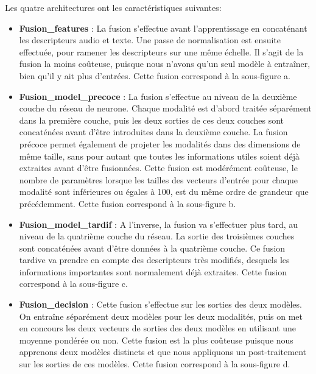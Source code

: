 

Les quatre architectures ont les caractéristiques suivantes:
\begin{itemize}
  \item \textbf{Fusion\_features} : La fusion s'effectue avant l'apprentissage en concaténant les descripteurs audio et texte. Une passe de normalisation est ensuite effectuée, pour ramener les descripteurs sur une même échelle. Il s'agit de la fusion la moins coûteuse, puisque nous n'avons qu'un seul modèle à entraîner, bien qu'il y ait plus d'entrées. Cette fusion correspond à la sous-figure a.
  \item \textbf{Fusion\_model\_precoce} : La fusion s'effectue  au niveau de la deuxième couche du réseau de neurone. Chaque modalité est d'abord traitée séparément dans la première couche, puis les deux sorties de ces deux couches sont concaténées avant d'être introduites dans la deuxième couche. La fusion précoce permet également de projeter les modalités dans des dimensions de même taille, sans pour autant que toutes les informations utiles soient déjà extraites avant d'être fusionnées. Cette fusion est modérément coûteuse, le nombre de paramètres lorsque les tailles des vecteurs d'entrée pour chaque modalité sont inférieures ou égales à 100, est du même ordre de grandeur que précédemment. Cette fusion correspond à la sous-figure b.
  \item \textbf{Fusion\_model\_tardif} : A l'inverse, la fusion va s'effectuer plus tard, au niveau de la quatrième couche du réseau. La sortie des troisièmes couches sont concaténées avant d'être données à la quatrième couche. Ce fusion tardive va prendre en compte des descripteurs très modifiés, desquels les informations importantes sont normalement déjà extraites. Cette fusion correspond à la sous-figure c.
  \item \textbf{Fusion\_decision} : Cette fusion s'effectue sur les sorties des deux modèles. On entraîne séparément deux modèles pour les deux modalités, puis on met en concours les deux vecteurs de sorties des deux modèles en utilisant une moyenne pondérée ou non. Cette fusion est la plus coûteuse puisque nous apprenons deux modèles distincts et que nous appliquons un post-traitement sur les sorties de ces modèles. Cette fusion correspond à la sous-figure d.
\end{itemize}

